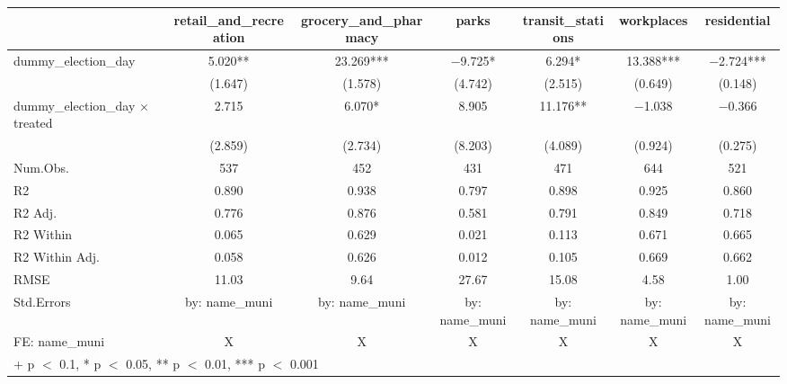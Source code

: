 \begin{table}
\centering
\begin{tabular}[t]{lcccccc}
\toprule
  & retail\_and\_recreation & grocery\_and\_pharmacy & parks & transit\_stations & workplaces & residential\\
\midrule
dummy\_election\_day & \num{5.020}** & \num{23.269}*** & \num{-9.725}* & \num{6.294}* & \num{13.388}*** & \num{-2.724}***\\
 & (\num{1.647}) & (\num{1.578}) & (\num{4.742}) & (\num{2.515}) & (\num{0.649}) & (\num{0.148})\\
dummy\_election\_day × treated & \num{2.715} & \num{6.070}* & \num{8.905} & \num{11.176}** & \num{-1.038} & \num{-0.366}\\
 & (\num{2.859}) & (\num{2.734}) & (\num{8.203}) & (\num{4.089}) & (\num{0.924}) & (\num{0.275})\\
\midrule
Num.Obs. & \num{537} & \num{452} & \num{431} & \num{471} & \num{644} & \num{521}\\
R2 & \num{0.890} & \num{0.938} & \num{0.797} & \num{0.898} & \num{0.925} & \num{0.860}\\
R2 Adj. & \num{0.776} & \num{0.876} & \num{0.581} & \num{0.791} & \num{0.849} & \num{0.718}\\
R2 Within & \num{0.065} & \num{0.629} & \num{0.021} & \num{0.113} & \num{0.671} & \num{0.665}\\
R2 Within Adj. & \num{0.058} & \num{0.626} & \num{0.012} & \num{0.105} & \num{0.669} & \num{0.662}\\
RMSE & \num{11.03} & \num{9.64} & \num{27.67} & \num{15.08} & \num{4.58} & \num{1.00}\\
Std.Errors & by: name\_muni & by: name\_muni & by: name\_muni & by: name\_muni & by: name\_muni & by: name\_muni\\
FE: name\_muni & X & X & X & X & X & X\\
\bottomrule
\multicolumn{7}{l}{\rule{0pt}{1em}+ p $<$ 0.1, * p $<$ 0.05, ** p $<$ 0.01, *** p $<$ 0.001}\\
\end{tabular}
\end{table}
